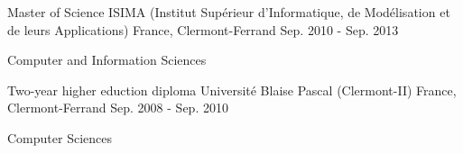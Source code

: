 

\begin{cventries}

  \cventry
    {Master of Science} %
    {ISIMA (Institut Supérieur d'Informatique, de Modélisation et de leurs Applications)} %
    {France, Clermont-Ferrand} %
    {Sep. 2010 - Sep. 2013} %
    {
      \begin{cvitems} %
        \item {Computer and Information Sciences}
      \end{cvitems}
    }

  \cventry
    {Two-year higher eduction diploma} %
    {Université Blaise Pascal (Clermont-II)} %
    {France, Clermont-Ferrand} %
    {Sep. 2008 - Sep. 2010} %
    {
      \begin{cvitems} %
        \item {Computer Sciences}
      \end{cvitems}
    }

\end{cventries}
